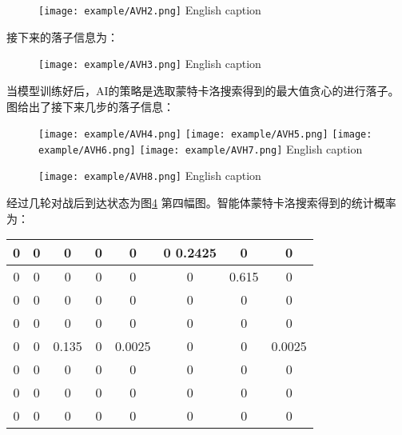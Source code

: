 \begin{figure}[!htp]
	\centering
	\texttt{[image: example/AVH2.png]}
	\hspace{0.5cm}
	{English caption}
	\label{fig:human2}
\end{figure}
接下来的落子信息为：
\begin{figure}[!htp]
	\centering
	\texttt{[image: example/AVH3.png]}
	\hspace{0.5cm}
	{English caption}
	\label{fig:human3}
\end{figure}
当模型训练好后，AI的策略是选取蒙特卡洛搜索得到的最大值贪心的进行落子。图给出了接下来几步的落子信息：
\begin{figure}[!htp]
	\centering
	\texttt{[image: example/AVH4.png]}
	\hspace{0.5cm}
	\texttt{[image: example/AVH5.png]}
	\hspace{0.5cm}
	\texttt{[image: example/AVH6.png]}
	\hspace{0.5cm}
	\texttt{[image: example/AVH7.png]}
	{English caption}
	\label{fig:AIvsHuman}
\end{figure}
\begin{figure}[!htp]
	\centering
	\texttt{[image: example/AVH8.png]}
	\hspace{0.5cm}
	{English caption}
	\label{fig:human4}
\end{figure}

经过几轮对战后到达状态为图\ref{fig:human4} 第四幅图。智能体蒙特卡洛搜索得到的统计概率为：

\begin{tabular}{|c|c|c|c|c|c|c|c|}
	\hline 
	0& 0 & 0 &0  & 0 &0 0.2425 & 0 &0  \\ 
	\hline 
	0 & 0 & 0 & 0 & 0 & 0 & 0.615 & 0 \\ 
	\hline 
	0 & 0 & 0 & 0 & 0 & 0 & 0 & 0 \\ 
	\hline 
	0 & 0 & 0 & 0 & 0& 0 & 0 & 0 \\ 
	\hline 
	0 & 0 & 0.135 & 0 & 0.0025 & 0 & 0 & 0.0025 \\ 
	\hline 
	0 & 0 & 0 & 0 & 0 & 0 & 0 & 0 \\ 
	\hline 
	0 & 0 & 0 & 0 & 0 & 0 & 0 & 0 \\ 
	\hline 
	0 & 0 & 0 & 0 & 0 & 0 & 0 & 0 \\ 
	\hline 
\end{tabular}

